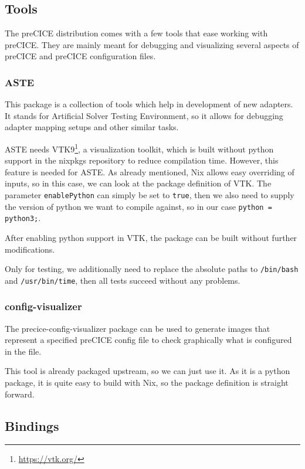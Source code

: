 \documentclass[conference,final,a4paper]{IEEEtran}
\begin{document}
\subsection{Tools}

The preCICE distribution comes with a few tools that ease working with preCICE.
They are mainly meant for debugging and visualizing several aspects of preCICE and preCICE configuration files.

\subsubsection{ASTE}

This package is a collection of tools which help in development of new adapters.
It stands for Artificial Solver Testing Environment, so it allows for debugging adapter mapping setups and other similar tasks.

ASTE needs VTK9\footnote{\url{https://vtk.org/}}, a visualization toolkit, which is built without python support in the nixpkgs repository to reduce compilation time.
However, this feature is needed for ASTE.
As already mentioned, Nix allows easy overriding of inputs, so in this case, we can look at the package definition of VTK.
The parameter \texttt{enablePython} can simply be set to \texttt{true}, then we also need to supply the version of python we want to compile against, so in our case \texttt{python = python3;}.

After enabling python support in VTK, the package can be built without further modifications.

Only for testing, we additionally need to replace the absolute paths to \texttt{/bin/bash} and \texttt{/usr/bin/time}, then all tests succeed without any problems.

\subsubsection{config-visualizer}

The precice-config-visualizer package can be used to generate images that represent a specified preCICE config file to check graphically what is configured in the file.

This tool is already packaged upstream, so we can just use it.
As it is a python package, it is quite easy to build with Nix, so the package definition is straight forward.

\subsection{Bindings}
\end{document}
